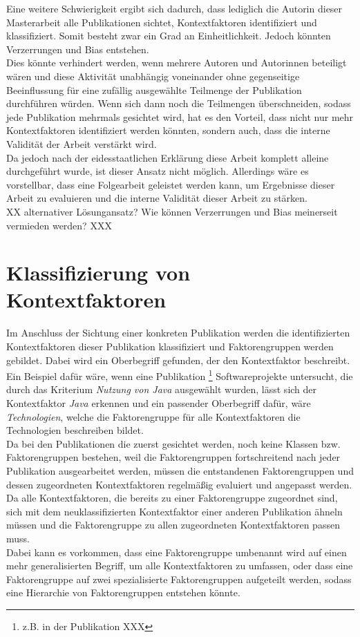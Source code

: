 Eine weitere Schwierigkeit ergibt sich dadurch, dass lediglich die Autorin dieser Masterarbeit alle Publikationen sichtet, Kontextfaktoren identifiziert und klassifiziert. Somit besteht zwar ein Grad an Einheitlichkeit. Jedoch könnten Verzerrungen und Bias entstehen. \\
Dies könnte verhindert werden, wenn mehrere Autoren und Autorinnen beteiligt wären und diese Aktivität unabhängig voneinander ohne gegenseitige Beeinflussung für eine zufällig ausgewählte Teilmenge der Publikation durchführen würden. Wenn sich dann noch die Teilmengen überschneiden, sodass jede Publikation mehrmals gesichtet wird, hat es den Vorteil, dass nicht nur mehr Kontextfaktoren identifiziert werden könnten, sondern auch, dass die interne Validität der Arbeit verstärkt wird. \\
Da jedoch nach der eidesstaatlichen Erklärung diese Arbeit komplett alleine durchgeführt wurde, ist dieser Ansatz nicht möglich. Allerdings wäre es vorstellbar, dass eine Folgearbeit geleistet werden kann, um Ergebnisse dieser Arbeit zu evaluieren und die interne Validität dieser Arbeit zu stärken. \\

XX alternativer Lösungansatz? Wie können Verzerrungen und Bias meinerseit vermieden werden? XXX \\

\section{Klassifizierung von Kontextfaktoren}
\label{sec:class-context}
Im Anschluss der Sichtung einer konkreten Publikation werden die identifizierten Kontextfaktoren dieser Publikation klassifiziert und Faktorengruppen werden gebildet. Dabei wird ein Oberbegriff gefunden, der den Kontextfaktor beschreibt. Ein Beispiel dafür wäre, wenn eine Publikation \footnote{z.B. in der Publikation XXX} Softwareprojekte untersucht, die durch das Kriterium \textit{Nutzung von Java} ausgewählt wurden, lässt sich der Kontextfaktor \textit{Java} erkennen und ein passender Oberbegriff dafür, wäre \textit{Technologien}, welche die Faktorengruppe für alle Kontextfaktoren die Technologien beschreiben bildet. \\

Da bei den Publikationen die zuerst gesichtet werden, noch keine Klassen bzw. Faktorengruppen bestehen, weil die Faktorengruppen fortschreitend nach jeder Publikation ausgearbeitet werden, müssen die entstandenen Faktorengruppen und dessen zugeordneten Kontextfaktoren regelmäßig evaluiert und angepasst werden. Da alle Kontextfaktoren, die bereits zu einer Faktorengruppe zugeordnet sind, sich mit dem neuklassifizierten Kontextfaktor einer anderen Publikation ähneln müssen und die Faktorengruppe zu allen zugeordneten Kontextfaktoren passen muss. \\
Dabei kann es vorkommen, dass eine Faktorengruppe umbenannt wird auf einen mehr generalisierten Begriff, um alle Kontextfaktoren zu umfassen, oder dass eine Faktorengruppe auf zwei spezialisierte Faktorengruppen aufgeteilt werden, sodass eine Hierarchie von Faktorengruppen entstehen könnte. \\

